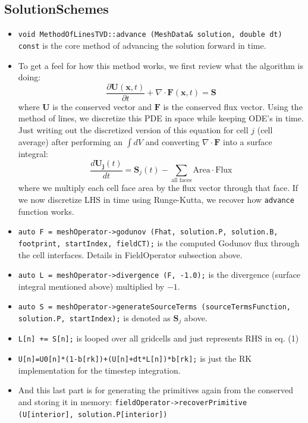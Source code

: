 \documentclass{article}
\begin{document}
\subsection{SolutionSchemes}
\begin{itemize}
	\item \texttt{void MethodOfLinesTVD::advance (MeshData\& solution, double dt) const} is the core method of advancing the solution forward in time. 
	\item To get a feel for how this method works, we first review what the algorithm is doing: 
	$$\frac{\partial \mathbf{U}(\mathbf{x},t)}{\partial t} + \nabla \cdot  \mathbf{F}(\mathbf{x},t) = \mathbf{S}$$ where $\mathbf{U}$ is the conserved vector and $\mathbf{F}$ is the conserved flux vector. Using the method of lines, we discretize this PDE in space while keeping ODE's in time. Just writing out the discretized version of this equation for cell $j$ (cell average) after performing an $\int dV$ and converting $\nabla \cdot \mathbf{F}$ into a surface integral:
	\begin{equation}
	\frac{d \mathbf{U_j}(t)}{dt} = \mathbf{S}_{j}(t)- \sum_{\text{all faces}} \text{Area} \cdot \text{Flux}
	\end{equation}
where we multiply each cell face area by the flux vector through that face. If we now discretize LHS in time using Runge-Kutta, we recover how \texttt{advance} function works.
	\item \texttt{auto F = meshOperator->godunov (Fhat, solution.P, solution.B, footprint, startIndex, fieldCT);} is the computed Godunov flux through the cell interfaces. Details in FieldOperator subsection above.
	\item \texttt{auto L = meshOperator->divergence (F, -1.0);} is the divergence (surface integral mentioned above) multiplied by $-1$.
	\item \texttt{auto S = meshOperator->generateSourceTerms (sourceTermsFunction, solution.P, startIndex);} is denoted as $\mathbf{S}_j$ above. 
	\item \texttt{L[n] += S[n];} is looped over all gridcells and just represents RHS in eq. (1)
	\item \texttt{U[n]=U0[n]*(1-b[rk])+(U[n]+dt*L[n])*b[rk];} is just the RK implementation for the timestep integration.
	\item And this last part is for generating the primitives again from the conserved and storing it in memory: \texttt{fieldOperator->recoverPrimitive (U[interior], solution.P[interior])}
\end{itemize}
\end{document}
